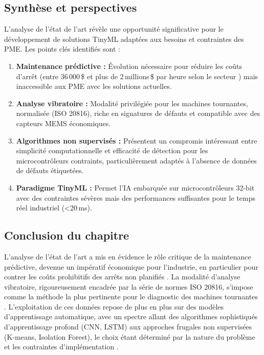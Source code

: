 \subsection{Synthèse et perspectives}

L'analyse de l'état de l'art révèle une opportunité significative pour le développement de solutions TinyML adaptées aux besoins et contraintes des PME. Les points clés identifiés sont :

\begin{enumerate}
\item \textbf{Maintenance prédictive :} Évolution nécessaire pour réduire les coûts d'arrêt (entre 36\,000\,\$ et plus de 2\,millions\,\$ par heure selon le secteur \cite{siemens2024}) mais inaccessible aux PME avec les solutions actuelles.

\item \textbf{Analyse vibratoire :} Modalité privilégiée pour les machines tournantes, normalisée (ISO 20816), riche en signatures de défauts et compatible avec des capteurs MEMS économiques.

\item \textbf{Algorithmes non supervisés :} Présentent un compromis intéressant entre simplicité computationnelle et efficacité de détection pour les microcontrôleurs contraints, particulièrement adaptés à l'absence de données de défauts étiquetées.

\item \textbf{Paradigme TinyML :} Permet l'IA embarquée sur microcontrôleurs 32-bit avec des contraintes sévères mais des performances suffisantes pour le temps réel industriel (<20\,ms).
\end{enumerate}

\subsection{Conclusion du chapitre}

L'analyse de l'état de l'art a mis en évidence le rôle critique de la maintenance prédictive, devenue un impératif économique pour l'industrie, en particulier pour contrer les coûts prohibitifs des arrêts non planifiés \cite{siemens2024}. La modalité d'analyse vibratoire, rigoureusement encadrée par la série de normes ISO 20816, s'impose comme la méthode la plus pertinente pour le diagnostic des machines tournantes \cite{iso20816-1,iso20816-3}. L'exploitation de ces données repose de plus en plus sur des modèles d'apprentissage automatique, avec un spectre allant des algorithmes sophistiqués d'apprentissage profond (CNN, LSTM) aux approches frugales non supervisées (K-means, Isolation Forest), le choix étant déterminé par la nature du problème et les contraintes d'implémentation \cite{bagri2024,antonini2023}.


